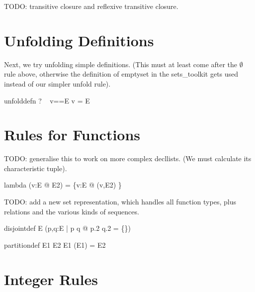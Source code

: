 \documentclass{article}
\begin{document}
TODO: transitive closure and reflexive transitive closure.


\section{Unfolding Definitions}

Next, we try unfolding simple definitions.
(This must at least come after the $\emptyset$ rule above,
otherwise the definition of emptyset in the sets\_toolkit
gets used instead of our simpler unfold rule).

\begin{zedrule}{unfolddefn}
  \proviso? ~ v==E
\derives
   v = E
\end{zedrule}


\section{Rules for Functions}

TODO: generalise this to work on more complex decllists.
(We must calculate its characteristic tuple).
\begin{zedrule}{lambda}
   (\lambda v:E @ E2) = \{v:E @ (v,E2) \}
\end{zedrule}


TODO: add a new set representation, which handles all function types,
plus relations and the various kinds of sequences.

\begin{zedrule}{disjointdef}
   \disjoint E \iff (\forall p,q:E | p \neq q @ p.2 \cap q.2 = \{\})
\end{zedrule}

\begin{zedrule}{partitiondef}
   E1 \partition E2 \iff \disjoint E1 \land \bigcup(\ran E1) = E2
\end{zedrule}


\section{Integer Rules}
\end{document}

